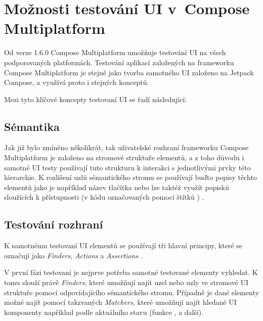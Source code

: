 

\section{Možnosti testování UI v~Compose Multiplatform}
Od verze 1.6.0 Compose Multiplatform umožňuje testování UI na všech podporovaných platformách. \cite{composeNews1.6.0}
Testování aplikací založených na frameworku Compose Multiplatform je stejně jako tvorba samotného UI založeno na Jetpack Compose, a využívá 
proto i stejných konceptů. 

\medskip

Mezi tyto klíčové koncepty testovaní UI se řadí následující:


\subsection*{Sémantika}
Jak již bylo zmíněno několikrát, tak uživatelské rozhraní frameworku Compose Multiplatform je založeno na stromové struktuře elementů, a z toho důvodu 
i samotné UI testy používají tuto strukturu k interakci s jednotlivými prvky této hierarchie. K rozlišení uzlů sémantického
stromu se používají buďto popisy těchto elementů jako je například název tlačítka nebo lze taktéž využít popisků
sloužících k přístupnosti (v kódu označovaných pomocí štítků ) \cite{testingUISeman}.


\subsection*{Testování rozhraní}
K samotnému testovaní UI elementů se používají tři hlavní principy, které se
označují jako \textit{Finders}, \textit{Actions} a  \textit{Assertions} \cite{testingUIApis}.

V první fázi testovaní je nejprve potřeba samotné testované elementy vyhledat. K tomu slouží právě \textit{Finders}, které  umožňují najít
 uzel nebo uzly ve stromové UI struktuře pomocí odpovídajícího sémantického stromu. Případně je dané elementy možné najít
pomocí takzvaných \textit{Matchers}, které umožňují najít hledané UI komponenty například podle aktuálního stavu 
(funkce ,  a další).

